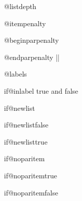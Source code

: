 \begin{docCommand}{@listdepth}{}
\end{docCommand}
\begin{docCommand}{@itempenalty}{}
\end{docCommand}
\begin{docCommand}{@beginparpenalty}{}
\end{docCommand}
\begin{docCommand}{@endparpenalty}{}
|\newcount\@endparpenalty|
\end{docCommand}
    \begin{teX}
\newcount\@listdepth {}
\newcount\@itempenalty
\newcount\@beginparpenalty

    \end{teX}


 \begin{docCommand}{@labels} {  }
 \end{docCommand}
    \begin{teX}
\newbox\@labels
    \end{teX}
 


 \begin{docCommand}{if@inlabel}{}
   true and false 
  \end{docCommand}
    \begin{teX}
\newif\if@inlabel \@inlabelfalse
    \end{teX}



\begin{docCommand}{ if@newlist} { }
\end{docCommand}
  \begin{teX}
\newif\if@newlist   \@newlistfalse
    \end{teX}
  
  \begin{docCommand}{if@newlistfalse }{}
  \end{docCommand}
  \begin{docCommand}{if@newlisttrue }{}
  \end{docCommand}
 
  
 
\begin{docCommand}{if@noparitem}{}
 \end{docCommand}
 \begin{docCommand}{ if@noparitemtrue}{}
 \end{docCommand}
 \begin{docCommand}{ if@noparitemfalse}{}
 \end{docCommand}
 
